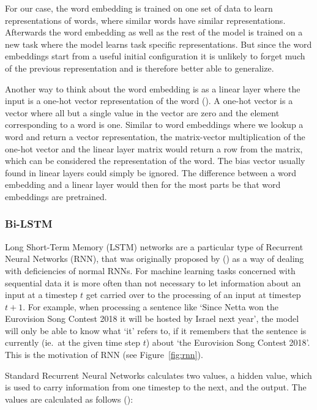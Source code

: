 For our case, the word embedding is trained on one set of data to learn
representations of words, where similar words have similar representations.
Afterwards the word embedding as well as the rest of the model is trained on a
new task where the model learns task specific representations. But since the
word embeddings start from a useful initial configuration it is unlikely to
forget much of the previous representation and is therefore better able to
generalize.

Another way to think about the word embedding is as a linear layer where the
input is a one-hot vector representation of the word
(\cite{goldberg2017neural}).
A one-hot vector is a vector where all but a single value in the vector are zero
and the element corresponding to a word is one. Similar to word embeddings where
we lookup a word and return a vector representation, the matrix-vector
multiplication of the one-hot vector and the linear layer matrix would return a
row from the matrix, which can be considered the representation of the word. The
bias vector usually found in linear layers could simply be ignored. The
difference between a word embedding and a linear layer would then for the most
parts be that word embeddings are pretrained.

\subsubsection{Bi-LSTM}\label{sec:setup-models-lstm}

Long Short-Term Memory (LSTM) networks are a particular type of Recurrent Neural
Networks (RNN), that was originally proposed by (\cite{hochreiter1997long}) as a
way of dealing with deficiencies of normal RNNs. For machine learning tasks
concerned with sequential data it is more often than not necessary to let
information about an input at a timestep $t$ get carried over to the processing
of an input at timestep $t+1$. For example, when processing a sentence like
`Since Netta won the Eurovision Song Contest 2018 it will be hosted by Israel
next year', the model will only be able to know what `it' refers to, if it
remembers that the sentence is currently (ie.\ at the given time step $t$) about
`the Eurovision Song Contest 2018'. This is the motivation of RNN (see
Figure~\ref{fig:rnn}).

Standard Recurrent Neural Networks calculates two values, a hidden value, which
is used to carry information from one timestep to the next, and the output. The
values are calculated as follows (\cite{goodfellow2016deep}):

